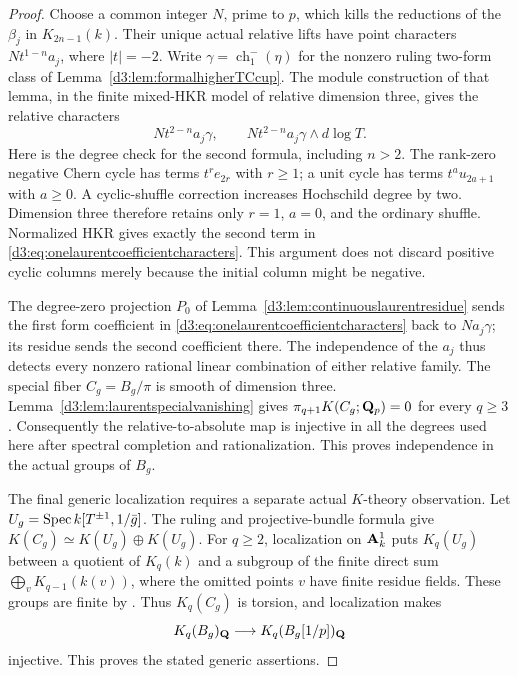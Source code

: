 \begin{proof}
Choose a common integer $N$, prime to $p$, which kills the
reductions of the $\beta_j$ in $K_{2n-1}(k)$.
Their unique actual relative lifts have point characters
$Nt^{1-n}a_j$, where $|t|=-2$.
Write $\gamma=\operatorname{ch}^-_1(\eta)$ for the nonzero ruling
two-form class of Lemma~\ref{d3:lem:formalhigherTCcup}.
The module construction of that lemma, in the finite mixed-HKR
model of relative dimension three, gives the relative characters
\begin{equation}\label{d3:eq:onelaurentcoefficientcharacters}
 Nt^{2-n}a_j\gamma,\qquad
 Nt^{2-n}a_j\gamma\wedge d\log T.
\end{equation}
Here is the degree check for the second formula, including $n>2$.
The rank-zero negative Chern cycle has terms $t^r e_{2r}$ with
$r\geq1$; a unit cycle has terms $t^a u_{2a+1}$ with $a\geq0$.
A cyclic-shuffle correction increases Hochschild degree by two.
Dimension three therefore retains only $r=1$, $a=0$, and the
ordinary shuffle. Normalized HKR gives exactly the second term
in \eqref{d3:eq:onelaurentcoefficientcharacters}.
This argument does not discard positive cyclic columns
merely because the initial column might be negative.

The degree-zero projection $P_0$ of
Lemma~\ref{d3:lem:continuouslaurentresidue} sends the first form
coefficient in \eqref{d3:eq:onelaurentcoefficientcharacters}
back to $Na_j\gamma$; its residue sends the second coefficient there.
The independence of the $a_j$ thus detects every nonzero rational
linear combination of either relative family.
The special fiber $C_g=B_g/\pi$ is smooth of dimension three.
Lemma~\ref{d3:lem:laurentspecialvanishing} gives
$\pi_{q+1}K(C_g;\mathbf Q_p)=0$ for every $q\geq3$.
Consequently the relative-to-absolute map is injective in all the
degrees used here after spectral completion and rationalization.
This proves independence in the actual groups of $B_g$.

The final generic localization requires a separate actual
$K$-theory observation. Let
$U_g=\operatorname{Spec} k[T^{\pm1},1/\bar g]$.
The ruling and projective-bundle formula give
$K(C_g)\simeq K(U_g)\oplus K(U_g)$.
For $q\geq2$, localization on $\mathbf A^1_k$
\cite[Sections~5--7]{Quillen} puts $K_q(U_g)$ between
a quotient of $K_q(k)$ and a subgroup of the finite direct sum
$\bigoplus_vK_{q-1}(k(v))$, where the omitted points $v$ have
finite residue fields. These groups are finite by
\cite{QuillenFinite}\cite[IV, Corollary~1.13]{Weibel}.
Thus $K_q(C_g)$ is torsion, and localization makes
\[
 K_q(B_g)_{\mathbf Q}\longrightarrow K_q(B_g[1/p])_{\mathbf Q}
\]
injective. This proves the stated generic assertions.
\end{proof}

